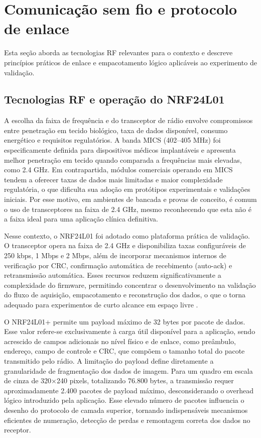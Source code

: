 \documentclass[repeatfields,xlists,xpacks,oneside]{ufrgscca}
\begin{document}
\section{Comunicação sem fio e protocolo de enlace}

Esta seção aborda as tecnologias RF relevantes para o contexto e descreve princípios práticos de enlace e empacotamento lógico aplicáveis ao experimento de validação.

\subsection{Tecnologias RF e operação do NRF24L01}

A escolha da faixa de frequência e do transceptor de rádio envolve compromissos entre penetração em tecido biológico, taxa de dados disponível, consumo energético e requisitos regulatórios. A banda MICS (402–405 MHz) foi especificamente definida para dispositivos médicos implantáveis e apresenta melhor penetração em tecido quando comparada a frequências mais elevadas, como 2.4 GHz. Em contrapartida, módulos comerciais operando em MICS tendem a oferecer taxas de dados mais limitadas e maior complexidade regulatória, o que dificulta sua adoção em protótipos experimentais e validações iniciais. Por esse motivo, em ambientes de bancada e provas de conceito, é comum o uso de transceptores na faixa de 2.4 GHz, mesmo reconhecendo que esta não é a faixa ideal para uma aplicação clínica definitiva.

Nesse contexto, o NRF24L01 foi adotado como plataforma prática de validação. O transceptor opera na faixa de 2.4 GHz e disponibiliza taxas configuráveis de 250 kbps, 1 Mbps e 2 Mbps, além de incorporar mecanismos internos de verificação por CRC, confirmação automática de recebimento (auto-ack) e retransmissão automática. Esses recursos reduzem significativamente a complexidade do firmware, permitindo concentrar o desenvolvimento na validação do fluxo de aquisição, empacotamento e reconstrução dos dados, o que o torna adequado para experimentos de curto alcance em espaço livre \cite{nordic2013,valdastri2008transmission}.

O NRF24L01+ permite um payload máximo de 32 bytes por pacote de dados. Esse valor refere-se exclusivamente à carga útil disponível para a aplicação, sendo acrescido de campos adicionais no nível físico e de enlace, como preâmbulo, endereço, campo de controle e CRC, que compõem o tamanho total do pacote transmitido pelo rádio. A limitação do payload define diretamente a granularidade de fragmentação dos dados de imagem. Para um quadro em escala de cinza de 320×240 pixels, totalizando 76.800 bytes, a transmissão requer aproximadamente 2.400 pacotes de payload máximo, desconsiderando o overhead lógico introduzido pela aplicação. Esse elevado número de pacotes influencia o desenho do protocolo de camada superior, tornando indispensáveis mecanismos eficientes de numeração, detecção de perdas e remontagem correta dos dados no receptor.
\end{document}
